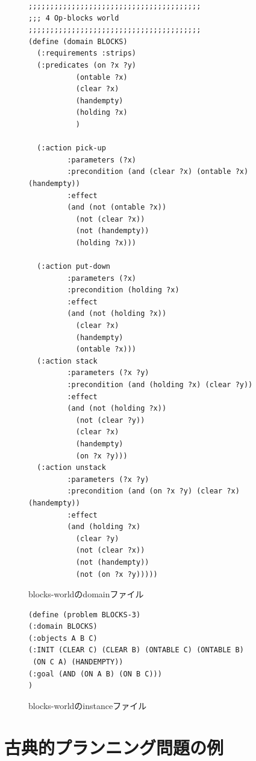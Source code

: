 \begin{figure}
\lstset{language=pddl,basicstyle=\ttfamily\footnotesize,breaklines=true}
\begin{lstlisting}
;;;;;;;;;;;;;;;;;;;;;;;;;;;;;;;;;;;;;;;;
;;; 4 Op-blocks world
;;;;;;;;;;;;;;;;;;;;;;;;;;;;;;;;;;;;;;;;
(define (domain BLOCKS)
  (:requirements :strips)
  (:predicates (on ?x ?y)
	       (ontable ?x)
	       (clear ?x)
	       (handempty)
	       (holding ?x)
	       )

  (:action pick-up
	     :parameters (?x)
	     :precondition (and (clear ?x) (ontable ?x) (handempty))
	     :effect
	     (and (not (ontable ?x))
		   (not (clear ?x))
		   (not (handempty))
		   (holding ?x)))

  (:action put-down
	     :parameters (?x)
	     :precondition (holding ?x)
	     :effect
	     (and (not (holding ?x))
		   (clear ?x)
		   (handempty)
		   (ontable ?x)))
  (:action stack
	     :parameters (?x ?y)
	     :precondition (and (holding ?x) (clear ?y))
	     :effect
	     (and (not (holding ?x))
		   (not (clear ?y))
		   (clear ?x)
		   (handempty)
		   (on ?x ?y)))
  (:action unstack
	     :parameters (?x ?y)
	     :precondition (and (on ?x ?y) (clear ?x) (handempty))
	     :effect
	     (and (holding ?x)
		   (clear ?y)
		   (not (clear ?x))
		   (not (handempty))
		   (not (on ?x ?y)))))
\end{lstlisting}
\caption{blocks-worldのdomainファイル}
\label{fig:pddl-domain}
\end{figure}

\begin{figure}
\lstset{language=pddl,basicstyle=\ttfamily\footnotesize,breaklines=true}
\begin{lstlisting}
(define (problem BLOCKS-3)
(:domain BLOCKS)
(:objects A B C)
(:INIT (CLEAR C) (CLEAR B) (ONTABLE C) (ONTABLE B)
 (ON C A) (HANDEMPTY))
(:goal (AND (ON A B) (ON B C)))
)

\end{lstlisting}
\caption{blocks-worldのinstanceファイル}
\label{fig:pddl-instance}
\end{figure}

\section{古典的プランニング問題の例}
\label{sec:classical-planning-example}

